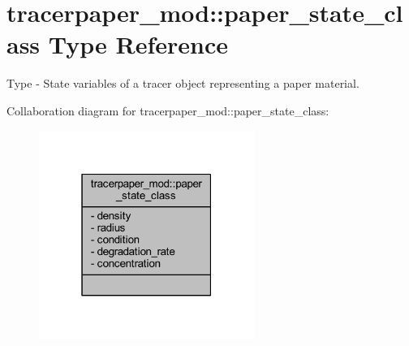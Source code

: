 \hypertarget{structtracerpaper__mod_1_1paper__state__class}{}\section{tracerpaper\+\_\+mod\+:\+:paper\+\_\+state\+\_\+class Type Reference}
\label{structtracerpaper__mod_1_1paper__state__class}


Type -\/ State variables of a tracer object representing a paper material.  




Collaboration diagram for tracerpaper\+\_\+mod\+:\+:paper\+\_\+state\+\_\+class\+:\nopagebreak
\begin{figure}[H]
\begin{center}
\leavevmode
\includegraphics[width=199pt]{structtracerpaper__mod_1_1paper__state__class__coll__graph}
\end{center}
\end{figure}
